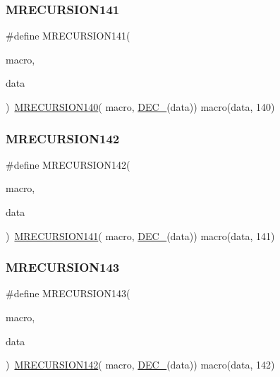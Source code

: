 \subsubsection{\texorpdfstring{MRECURSION141}{MRECURSION141}}
{\footnotesize\ttfamily \#define M\+R\+E\+C\+U\+R\+S\+I\+O\+N141(\begin{DoxyParamCaption}\item[{}]{macro,  }\item[{}]{data }\end{DoxyParamCaption})~\mbox{\hyperlink{group__group__sam0__utils__mrecursion_gad48f900c9eaf24623bd027ea995b45ad}{M\+R\+E\+C\+U\+R\+S\+I\+O\+N140}}(  macro, \mbox{\hyperlink{group__group__sam0__utils__mrecursion_ga1d23d683797679dca8c3512a54a5dcae}{D\+E\+C\+\_\+}}(data))   macro(data, 140)}

\mbox{\label{group__group__sam0__utils__mrecursion_ga815d871c17da260055328809979ff474}} 
\subsubsection{\texorpdfstring{MRECURSION142}{MRECURSION142}}
{\footnotesize\ttfamily \#define M\+R\+E\+C\+U\+R\+S\+I\+O\+N142(\begin{DoxyParamCaption}\item[{}]{macro,  }\item[{}]{data }\end{DoxyParamCaption})~\mbox{\hyperlink{group__group__sam0__utils__mrecursion_ga5868ade7134f4814c3e19853c9cd518c}{M\+R\+E\+C\+U\+R\+S\+I\+O\+N141}}(  macro, \mbox{\hyperlink{group__group__sam0__utils__mrecursion_ga1d23d683797679dca8c3512a54a5dcae}{D\+E\+C\+\_\+}}(data))   macro(data, 141)}

\mbox{\label{group__group__sam0__utils__mrecursion_ga13c48d426b2457b2bb7ded0974e15122}} 
\subsubsection{\texorpdfstring{MRECURSION143}{MRECURSION143}}
{\footnotesize\ttfamily \#define M\+R\+E\+C\+U\+R\+S\+I\+O\+N143(\begin{DoxyParamCaption}\item[{}]{macro,  }\item[{}]{data }\end{DoxyParamCaption})~\mbox{\hyperlink{group__group__sam0__utils__mrecursion_ga815d871c17da260055328809979ff474}{M\+R\+E\+C\+U\+R\+S\+I\+O\+N142}}(  macro, \mbox{\hyperlink{group__group__sam0__utils__mrecursion_ga1d23d683797679dca8c3512a54a5dcae}{D\+E\+C\+\_\+}}(data))   macro(data, 142)}

